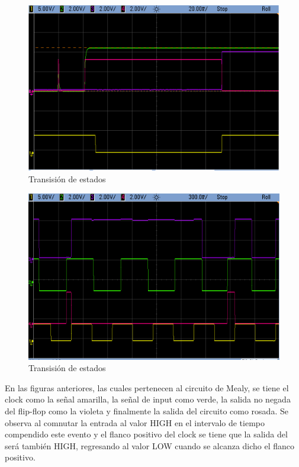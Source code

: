 \begin{figure}[H]
\begin{centering}
\includegraphics[scale=0.5]{../Ejercicio-3/imagenes/e3_tp3.png}
\par\end{centering}
\caption{Transisión de estados}

\end{figure}

\begin{figure}[H]
\begin{centering}
\includegraphics[scale=0.5]{../Ejercicio-3/imagenes/e3_tp3_b.png}
\par\end{centering}
\caption{Transisión de estados}

\end{figure}

En las figuras anteriores, las cuales pertenecen al circuito de Mealy, se tiene el clock como la señal amarilla, la señal de input como verde, la salida no negada del flip-flop como la violeta y finalmente la salida del circuito como rosada. Se observa al comnutar la entrada al valor HIGH en el intervalo de tiempo compendido este evento y el flanco positivo del clock se tiene que la salida del será también HIGH, regresando al valor LOW cuando se alcanza dicho el flanco positivo.

